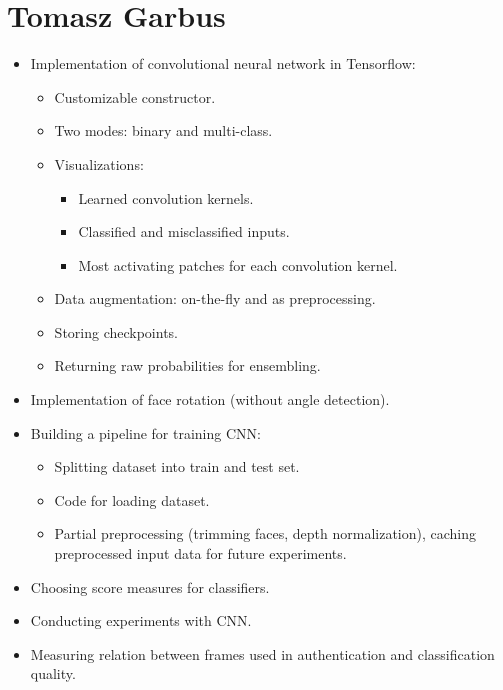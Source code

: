     \section{Tomasz Garbus}
        \begin{itemize}
            \item Implementation of convolutional neural network in Tensorflow:
            \begin{itemize}
                \item Customizable constructor.
                \item Two modes: binary and multi-class.
                \item Visualizations:
                    \begin{itemize}
                        \item Learned convolution kernels.
                        \item Classified and misclassified inputs.
                        \item Most activating patches for each convolution kernel.
                    \end{itemize}
                \item Data augmentation: on-the-fly and as preprocessing.
                \item Storing checkpoints.
                \item Returning raw probabilities for ensembling.
            \end{itemize}
            \item Implementation of face rotation (without angle detection).
            \item Building a pipeline for training CNN:
            \begin{itemize}
                \item Splitting dataset into train and test set.
                \item Code for loading dataset.
                \item Partial preprocessing (trimming faces, depth normalization),
                      caching preprocessed input data for future experiments.
            \end{itemize}
            \item Choosing score measures for classifiers.
            \item Conducting experiments with CNN.
            \item Measuring relation between frames used in authentication and
                  classification quality.
        \end{itemize}

